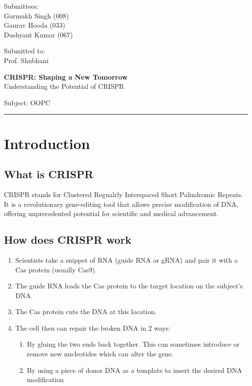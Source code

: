 \documentclass[a4paper,12pt]{article}
\begin{document}
  \begin{flushleft}
    \small
    Submittees: \\
    Gurmukh Singh (008)\\
    Gaurav Hooda (033)\\
    Dushyant Kumar (067)
  \end{flushleft}
  \vspace{-0.94in}
  \begin{flushright}
    \small
    Submitted to:\\
    Prof. Shubhani
  \end{flushright}
  \begin{center}
    \Large{\textbf{CRISPR: Shaping a New Tomorrow}}\\
    \large{Understanding the Potential of CRISPR}
  \end{center}
  \begin{flushright}
    \small
    Subject: OOPC
  \end{flushright}
  \hrule
  \section{Introduction}
  \subsection{What is CRISPR}
  CRISPR stands for Clustered Regualrly Interspaced Short Palindromic Repeats. It is a revolutionary gene-editing tool that allows precise modification of DNA, offering unprecedented potential for scientific and medical advancement. 
  \subsection{How does CRISPR work}
  \begin{enumerate}
    \item Scientists take a snippet of RNA (guide RNA or gRNA) and pair it with a Cas protein (usually Cas9).
    \item The guide RNA leads the Cas protein to the target location on the subject's DNA.
    \item The Cas protein cuts the DNA at this location.
    \item The cell then can repair the broken DNA in 2 ways:
      \begin{enumerate}
        \item By gluing the two ends back together. This can sometimes introduce or remove new nucleotides which can alter the gene.
        \item By using a piece of donor DNA as a template to insert the desired DNA modification
      \end{enumerate}
  \end{enumerate}
\end{document}
